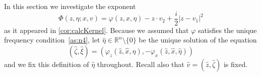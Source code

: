 \documentclass[
	fontsize=11pt, 
	twoside=false, 
	abstract=true, 
	a4paper,
]{scrartcl}
\newcommand{\sem}{\setminus\{0\}}
\newcommand{\RR}{\mathbb{R}}
\newcommand{\abs}[1]{\left\lvert#1\right\rvert}
\newcommand{\del}{\partial}
\begin{document}
In this section we investigate the exponent 
\[
	\Phi(z,\eta;x,v) =  \varphi(z,x,\eta)-z\cdot v_2+\frac{i}{2}\abs{z-v_1}^2
\]
as it appeared in \cref{cor:calcKernel}. Because we assumed that $\varphi$ satisfies the unique frequency condition~\ref{as:n4}, let $\hat\eta\in\RR^n\sem$ be the unique solution of the equation
\[
	(\hat \zeta, \hat\xi) = (\varphi_z(\hat z,\hat x,\hat\eta), -\varphi_x(\hat z,\hat x,\hat \eta))
\]
and we fix this definition of $\hat\eta$ throughout. Recall also that $\hat v = (\hat z, \hat \zeta)$ is fixed.




%
%
\end{document}
